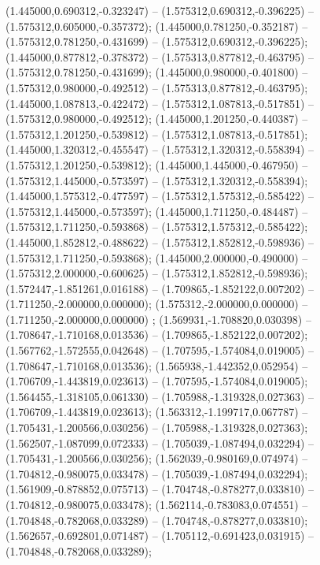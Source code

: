  (1.445000,0.690312,-0.323247) -- (1.575312,0.690312,-0.396225) -- (1.575312,0.605000,-0.357372);
 (1.445000,0.781250,-0.352187) -- (1.575312,0.781250,-0.431699) -- (1.575312,0.690312,-0.396225);
 (1.445000,0.877812,-0.378372) -- (1.575313,0.877812,-0.463795) -- (1.575312,0.781250,-0.431699);
 (1.445000,0.980000,-0.401800) -- (1.575312,0.980000,-0.492512) -- (1.575313,0.877812,-0.463795);
 (1.445000,1.087813,-0.422472) -- (1.575312,1.087813,-0.517851) -- (1.575312,0.980000,-0.492512);
 (1.445000,1.201250,-0.440387) -- (1.575312,1.201250,-0.539812) -- (1.575312,1.087813,-0.517851);
 (1.445000,1.320312,-0.455547) -- (1.575312,1.320312,-0.558394) -- (1.575312,1.201250,-0.539812);
 (1.445000,1.445000,-0.467950) -- (1.575312,1.445000,-0.573597) -- (1.575312,1.320312,-0.558394);
 (1.445000,1.575312,-0.477597) -- (1.575312,1.575312,-0.585422) -- (1.575312,1.445000,-0.573597);
 (1.445000,1.711250,-0.484487) -- (1.575312,1.711250,-0.593868) -- (1.575312,1.575312,-0.585422);
 (1.445000,1.852812,-0.488622) -- (1.575312,1.852812,-0.598936) -- (1.575312,1.711250,-0.593868);
 (1.445000,2.000000,-0.490000) -- (1.575312,2.000000,-0.600625) -- (1.575312,1.852812,-0.598936);
 (1.572447,-1.851261,0.016188) -- (1.709865,-1.852122,0.007202) -- (1.711250,-2.000000,0.000000);
 (1.575312,-2.000000,0.000000) -- (1.711250,-2.000000,0.000000) ;
 (1.569931,-1.708820,0.030398) -- (1.708647,-1.710168,0.013536) -- (1.709865,-1.852122,0.007202);
 (1.567762,-1.572555,0.042648) -- (1.707595,-1.574084,0.019005) -- (1.708647,-1.710168,0.013536);
 (1.565938,-1.442352,0.052954) -- (1.706709,-1.443819,0.023613) -- (1.707595,-1.574084,0.019005);
 (1.564455,-1.318105,0.061330) -- (1.705988,-1.319328,0.027363) -- (1.706709,-1.443819,0.023613);
 (1.563312,-1.199717,0.067787) -- (1.705431,-1.200566,0.030256) -- (1.705988,-1.319328,0.027363);
 (1.562507,-1.087099,0.072333) -- (1.705039,-1.087494,0.032294) -- (1.705431,-1.200566,0.030256);
 (1.562039,-0.980169,0.074974) -- (1.704812,-0.980075,0.033478) -- (1.705039,-1.087494,0.032294);
 (1.561909,-0.878852,0.075713) -- (1.704748,-0.878277,0.033810) -- (1.704812,-0.980075,0.033478);
 (1.562114,-0.783083,0.074551) -- (1.704848,-0.782068,0.033289) -- (1.704748,-0.878277,0.033810);
 (1.562657,-0.692801,0.071487) -- (1.705112,-0.691423,0.031915) -- (1.704848,-0.782068,0.033289);
